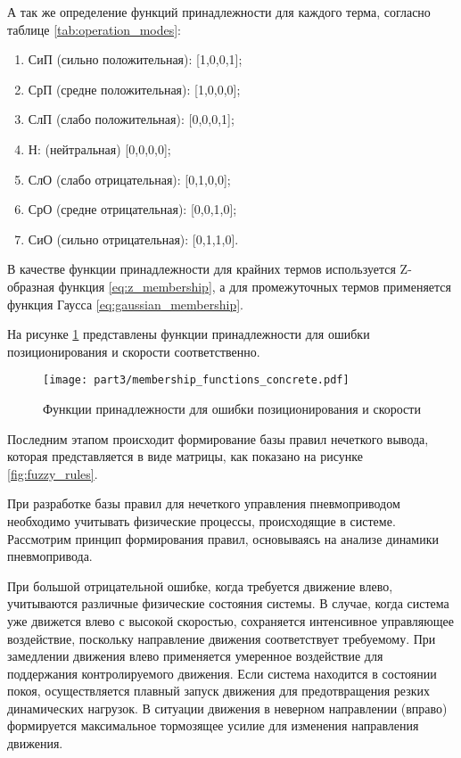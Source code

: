 А так же определение функций принадлежности для каждого терма, согласно таблице
\ref{tab:operation_modes}:
\begin{enumerate}
	\item СиП (сильно положительная): [1,0,0,1];
	\item СрП (средне положительная): [1,0,0,0];
	\item СлП (слабо положительная): [0,0,0,1];
	\item Н: (нейтральная) [0,0,0,0];
	\item СлО (слабо отрицательная): [0,1,0,0];
	\item СрО (средне отрицательная): [0,0,1,0];
	\item СиО (сильно отрицательная): [0,1,1,0].
\end{enumerate}

В качестве функции принадлежности для крайних термов используется Z-образная функция \ref{eq:z_membership},
а для промежуточных термов применяется функция Гаусса \ref{eq:gaussian_membership}.

На рисунке \ref{fig:membership_functions_concrete} представлены функции принадлежности
для ошибки позиционирования и скорости соответственно.

\begin{figure}[ht]
	\centering
	\texttt{[image: part3/membership\_functions\_concrete.pdf]}
	\caption{Функции принадлежности для ошибки позиционирования и скорости}
	\label{fig:membership_functions_concrete}
\end{figure}

Последним этапом происходит формирование базы правил нечеткого вывода, которая представляется
в виде матрицы, как показано на рисунке \ref{fig:fuzzy_rules}.

При разработке базы правил для нечеткого управления пневмоприводом
необходимо учитывать физические процессы, происходящие в системе.
Рассмотрим принцип формирования правил, основываясь на анализе
динамики пневмопривода.

При большой отрицательной ошибке, когда требуется движение влево,
учитываются различные физические состояния системы. В случае,
когда система уже движется влево с высокой скоростью, сохраняется
интенсивное управляющее воздействие, поскольку направление движения
соответствует требуемому. При замедлении движения влево применяется
умеренное воздействие для поддержания контролируемого движения.
Если система находится в состоянии покоя, осуществляется плавный
запуск движения для предотвращения резких динамических нагрузок.
В ситуации движения в неверном направлении (вправо) формируется
максимальное тормозящее усилие для изменения направления движения.

